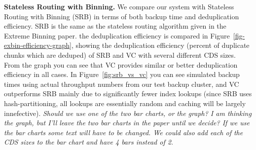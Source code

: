 {\bf Stateless Routing with Binning.}
We compare our system with Stateless Routing with Binning (SRB) in terms of
both backup time and deduplication efficiency. SRB is the same as the stateless
routing algorithm given in the Extreme Binning\cite{??} paper. the
deduplication efficiency is compared in
Figure~\ref{fig-exbin-efficiency-graph}, showing the deduplication efficiency
(percent of duplicate chunks which are deduped) of SRB and VC with several
different CDS sizes. From the graph you can see that VC provides similar or
better deduplication efficiency in all cases. In Figure~\ref{fig:srb_vs_vc} you
can see simulated backup times using actual throughput numbers from our test
backup cluster, and VC outperforms SRB mainly due to significantly fewer index
lookups (since SRB uses hash-partitioning, all lookups are essentially random
and caching will be largely innefective).  \emph{Should we use one of the two
bar charts, or the graph? I am thinking the graph, but I'll leave the two bar
charts in the paper until we decide? If we use the bar charts some text will
have to be changed. We could also add each of the CDS sizes to the bar chart
and have 4 bars instead of 2.}

